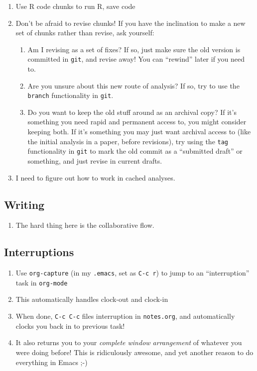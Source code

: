 \documentclass[11pt]{article}
\begin{document}
\begin{enumerate}
\item Use R code chunks to run R, save code
\item Don't be afraid to revise chunks!  If you have the inclination to make a new set of chunks rather than revise, ask yourself:
\begin{enumerate}
\item Am I revising as a set of fixes?  If so, just make sure the old version is committed in \texttt{git}, and revise away! You can ``rewind'' later if you need to.
\item Are you unsure about this new route of analysis?  If so, try to use the \texttt{branch} functionality in \texttt{git}.
\item Do you want to keep the old stuff around as an archival copy?  If it's something you need rapid and permanent access to, you might consider keeping both.  If it's something you may just want archival access to (like the initial analysis in a paper, before revisions), try using the \texttt{tag} functionality in \texttt{git} to mark the old commit as a ``submitted draft'' or something, and just revise in current drafts.
\end{enumerate}
\item I need to figure out how to work in cached analyses.
\end{enumerate}
\subsection{Writing}
\label{sec-4-5}

\begin{enumerate}
\item The hard thing here is the collaborative flow.
\end{enumerate}
\subsection{Interruptions}
\label{sec-4-6}

\begin{enumerate}
\item Use \texttt{org-capture} (in my \texttt{.emacs}, set as \texttt{C-c r}) to jump to an ``interruption'' task in \texttt{org-mode}
\item This automatically handles clock-out and clock-in
\item When done, \texttt{C-c C-c} files interruption in \texttt{notes.org}, and automatically clocks you back in to previous task!
\item It also returns you to your \emph{complete window arrangement} of whatever you were doing before!  This is ridiculously awesome, and yet another reason to do everything in Emacs ;-)
\end{enumerate}
\end{document}
